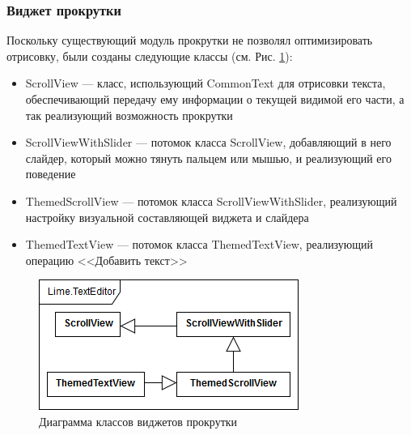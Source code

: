 \documentclass{fefu}
\begin{document}
			\subsubsection{Виджет прокрутки}
				\par Поскольку существующий модуль прокрутки не позволял оптимизировать
				отрисовку, были созданы следующие классы (см. Рис. \ref{diag:ScrollView}):
				\begin{itemize}
					\item ScrollView --- класс, использующий CommonText для отрисовки текста,
					обеспечивающий передачу ему информации о текущей видимой его части, а так
					реализующий возможность прокрутки
					\item ScrollViewWithSlider --- потомок класса ScrollView, добавляющий в 
					него слайдер, который можно тянуть пальцем или мышью, и реализующий его
					поведение
					\item ThemedScrollView --- потомок класса ScrollViewWithSlider,
					реализующий настройку визуальной составляющей виджета и слайдера
					\item ThemedTextView --- потомок класса ThemedTextView, реализующий 
					операцию <<Добавить текст>>
				\end{itemize}
				\begin{figure}[H]
					\centering
					\includegraphics[width=0.5\linewidth]{diagrams/ScrollView.png}
					\caption{Диаграмма классов виджетов прокрутки}
					\label{diag:ScrollView}
				\end{figure}
\end{document}

